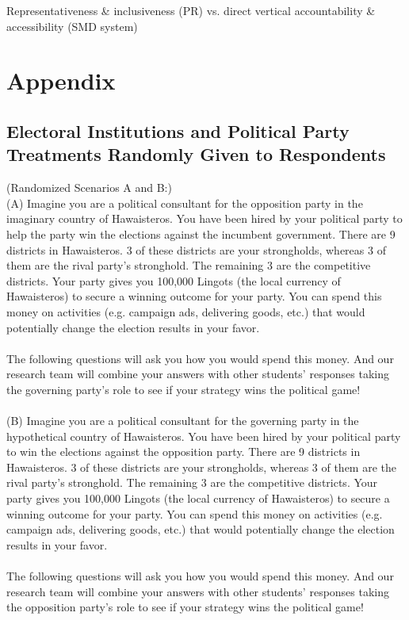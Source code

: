 \documentclass{article}
\begin{document}
Representativeness \& inclusiveness (PR) vs. direct vertical accountability \& accessibility (SMD system)

\fi

\section{Appendix}
\subsection{Electoral Institutions and Political Party Treatments Randomly Given to Respondents}
(Randomized Scenarios A and B:)\\
(A) Imagine you are a political consultant for the opposition party in the imaginary country of Hawaisteros. You have been hired by your political party to help the party win the elections against the incumbent government. There are 9 districts in Hawaisteros. 3 of these districts are your strongholds, whereas 3 of them are the rival party's stronghold. The remaining 3 are the competitive districts. Your party gives you 100,000 Lingots (the local currency of Hawaisteros) to secure a winning outcome for your party. You can spend this money on activities (e.g. campaign ads, delivering goods, etc.) that would potentially change the election results in your favor. \\
\\
The following questions will ask you how you would spend this money. And our research team will combine your answers with other students' responses taking the governing party's role to see if your strategy wins the political game!\\
\\
(B) Imagine you are a political consultant for the governing party in the hypothetical country of Hawaisteros. You have been hired by your political party to win the elections against the opposition party. There are 9 districts in Hawaisteros. 3 of these districts are your strongholds, whereas 3 of them are the rival party's stronghold. The remaining 3 are the competitive districts. Your party gives you 100,000 Lingots (the local currency of Hawaisteros) to secure a winning outcome for your party. You can spend this money on activities (e.g. campaign ads, delivering goods, etc.) that would potentially change the election results in your favor.\\
\\
The following questions will ask you how you would spend this money. And our research team will combine your answers with other students' responses taking the opposition party's role to see if your strategy wins the political game!\\
\end{document}
